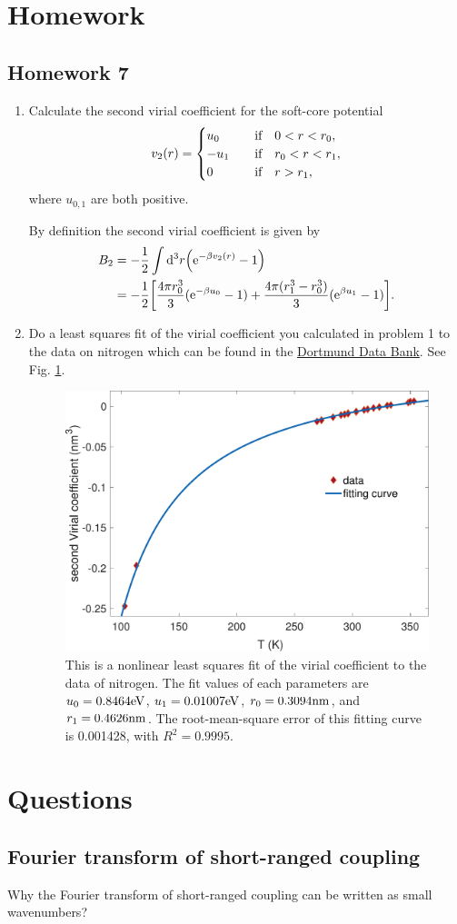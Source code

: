 \documentclass[10pt]{article}
\begin{document}
	\newpage

	\section{Homework}\label{sec: homework}

	\subsection{Homework 7}
	\begin{enumerate}
		\item Calculate the second virial coefficient for the soft-core potential
		\begin{equation}
			v_2(r) =
			\begin{cases}
				u_0 & \qif 0 < r < r_0, \\
				-u_1 & \qif r_0 < r < r_1, \\
				0 & \qif r > r_1,
			\end{cases}
		\end{equation}
		where $u_{0,1}$ are both positive.

		By definition the second virial coefficient is given by
		\begin{align}
			B_2 &= -\frac{1}{2} \int \dd^3 r \qty({\mathrm{e}}^{-\beta v_2(r)} - 1) \\
			&= -\frac{1}{2} \qty[\frac{4\pi r_0^3}{3}({\mathrm{e}}^{-\beta u_0} - 1) + \frac{4\pi (r_1^3 - r_0^3)}{3}({\mathrm{e}}^{\beta u_1} - 1)].
		\end{align}
		\item Do a least squares fit of the virial coefficient you calculated in problem 1 to the data on nitrogen which can be found in the \href{http://www.ddbst.com/en/EED/PCP/BII_C1056.php}{Dortmund Data Bank}. See Fig. \ref{fig: virial fit}.
		\begin{figure}[htbp]
			\centering
			\includegraphics[width=0.7 \textwidth]{figure/virial_fit.pdf}
			\caption{This is a nonlinear least squares fit of the virial coefficient to the data of nitrogen. The fit values of each parameters are $u_0 = 0.8464 {\mathrm{eV}}$, $u_1 = 0.01007 {\mathrm{eV}}$, $r_0 = 0.3094 {\mathrm{nm}}$, and $r_1 = 0.4626 {\mathrm{nm}}$. The root-mean-square error of this fitting curve is 0.001428, with $R^2 = 0.9995$.}
			\label{fig: virial fit}
		\end{figure}
	\end{enumerate}

	\section{Questions}

	\subsection{Fourier transform of short-ranged coupling}
	Why the Fourier transform of short-ranged coupling can be written as small wavenumbers?
\end{document}
